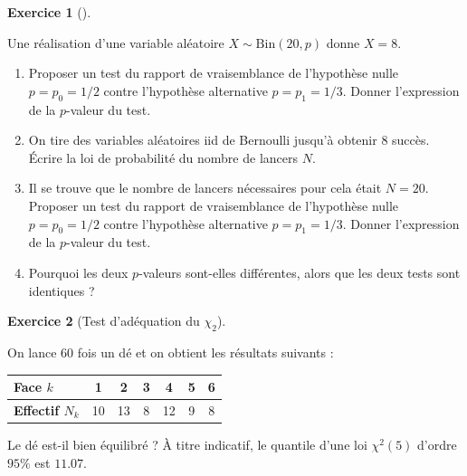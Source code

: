 \documentclass[
  10,
  letterpaper,
  DIV=11,
  numbers=noendperiod]{scrreport}
\providecommand{\tightlist}{%
  \setlength{\itemsep}{0pt}\setlength{\parskip}{0pt}}\usepackage{longtable,booktabs,array}
\theoremstyle{plain}
\theoremstyle{definition}
\newtheorem{exercise}{Exercice}[chapter]
\theoremstyle{plain}
\theoremstyle{definition}
\theoremstyle{definition}
\theoremstyle{plain}
\theoremstyle{remark}
\begin{document}
\begin{exercise}[]\protect\hypertarget{exr-binomtest}{}\label{exr-binomtest}

Une réalisation d'une variable aléatoire \(X \sim \mathrm{Bin}(20,p)\)
donne \(X = 8\).

\begin{enumerate}
\def\labelenumi{\arabic{enumi}.}
\tightlist
\item
  Proposer un test du rapport de vraisemblance de l'hypothèse nulle
  \(p=p_0=1/2\) contre l'hypothèse alternative \(p=p_1=1/3\). Donner
  l'expression de la \(p\)-valeur du test.
\item
  On tire des variables aléatoires iid de Bernoulli jusqu'à obtenir 8
  succès. Écrire la loi de probabilité du nombre de lancers \(N\).
\item
  Il se trouve que le nombre de lancers nécessaires pour cela était
  \(N=20\). Proposer un test du rapport de vraisemblance de l'hypothèse
  nulle \(p=p_0=1/2\) contre l'hypothèse alternative \(p=p_1=1/3\).
  Donner l'expression de la \(p\)-valeur du test.
\item
  Pourquoi les deux \(p\)-valeurs sont-elles différentes, alors que les
  deux tests sont identiques ?
\end{enumerate}

\end{exercise}

\begin{exercise}[Test d'adéquation du
\(\chi_2\)]\protect\hypertarget{exr-testdé}{}\label{exr-testdé}

On lance \(60\) fois un dé et on obtient les résultats suivants :

\begin{longtable}[]{@{}lcccccc@{}}
\toprule\noalign{}
\textbf{Face \(k\)} & 1 & 2 & 3 & 4 & 5 & 6 \\
\midrule\noalign{}
\endhead
\bottomrule\noalign{}
\endlastfoot
\textbf{Effectif \(N_k\)} & 10 & 13 & 8 & 12 & 9 & 8 \\
\end{longtable}

Le dé est-il bien équilibré ? À titre indicatif, le quantile d'une loi
\(\chi^2(5)\) d'ordre \(95\%\) est \(11.07\).

\end{exercise}
\end{document}
